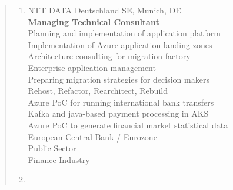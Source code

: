 \documentclass[a4paper]{report}
\begin{document}
\begin{quote}
\begin{enumerate}

\item[2024 - 2025]
                    NTT DATA Deutschland SE, Munich, DE\\
                    \textbf{Managing Technical Consultant}\\
                    Planning and implementation of application platform\\
                    Implementation of Azure application landing zones\\
                    Architecture consulting for migration factory\\
                    Enterprise application management\\
                    Preparing migration strategies for decision makers\\
                    Rehost, Refactor, Rearchitect, Rebuild\\
                    Azure PoC for running international bank transfers\\
                    Kafka and java-based payment processing in AKS\\
                    Azure PoC to generate financial market statistical data\\
                    European Central Bank / Eurozone\\
                    Public Sector\\
                    Finance Industry
\item[ ]


\end{enumerate}
\end{quote}
\end{document}
